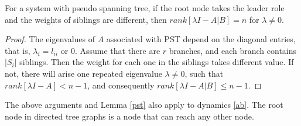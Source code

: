 \documentclass[a4paper,11pt]{article}
\begin{document}
\begin{lemma}\label{pst}
For a system with pseudo spanning tree, if the root node takes the leader role and the weights of siblings are different, then $rank[\lambda I-A|B]=n$ for $\lambda\ne0$.
\end{lemma}
\begin{proof}
The eigenvalues of $A$ associated with PST depend on the diagonal entries, that is, $\lambda_i=l_{ii}$ or $0$. Assume that there are $r$ branches, and each branch contains $|S_i|$ siblings. Then the weight for each one in the siblings takes different value. If not, there will arise one repeated eigenvalue $\lambda\ne 0$, such that $rank[\lambda I-A]<n-1$, and consequently $rank[\lambda I-A|B]\leq n-1$.
\end{proof}
\begin{remark}
The above arguments and Lemma \ref{pst} also apply to dynamics \eqref{ab}. The root node in directed tree graphs is a node that can reach any other node.
\end{remark}
\end{document}
